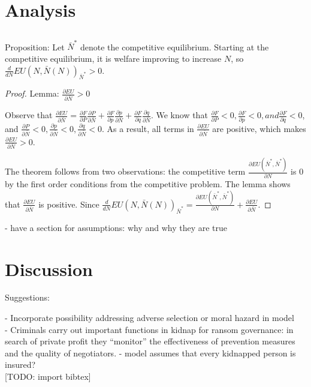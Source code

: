 \documentclass[12pt]{article}
\begin{document}
\section{Analysis}  

\subsection{}

Proposition: Let $\bar{N}^*$ denote the competitive equilibrium. Starting at the competitive equilibrium, it is welfare improving to increase $N$, so $\frac{d}{dN}EU(N,\bar{N}(N))_{\bar{N}^*} > 0$.

\begin{proof}

Lemma: $\frac{\partial EU}{\partial \bar{N}} > 0$

Observe that $\frac{\partial EU}{\partial \bar{N}} = \frac{\partial F}{\partial P} \frac{\partial P}{\partial \bar{N}} + \frac{\partial F}{\partial p} \frac{\partial p}{\partial \bar{N}} + \frac{\partial F}{\partial q} \frac{\partial q}{\partial \bar{N}}$. We know that $\frac{\partial F}{\partial P} < 0, \frac{\partial F}{\partial p} < 0, and \frac{\partial F}{\partial q} < 0$, and $\frac{\partial P}{\partial \bar{N}} <0, \frac{\partial p}{\partial \bar{N}} < 0, \frac{\partial q}{\partial \bar{N}} < 0$. As a result, all terms in  $\frac{\partial EU}{\partial \bar{N}}$ are positive, which makes $\frac{\partial EU}{\partial \bar{N}} > 0$.

The theorem follows from two observations: the competitive term $\frac{\partial EU(\bar{N}^*, \bar{N}^*)}{\partial N}$ is 0 by the first order conditions from the competitive problem. The lemma shows that $\frac{\partial EU}{\partial \bar{N}}$ is positive. Since $\frac{d}{dN}EU(N,\bar{N}(N))_{\bar{N}^*} = \frac{\partial EU(\bar{N}^*, \bar{N}^*)}{\partial N} + \frac{\partial EU}{\partial \bar{N}}$.
\end{proof}


- have a section for assumptions: why and why they are true

\section{Discussion}

Suggestions:

- Incorporate possibility addressing adverse selection or moral hazard in model \\
- Criminals carry out important functions in kidnap for ransom governance: in search of private profit they “monitor” the effectiveness of prevention measures and the quality of negotiators.
- model assumes that every kidnapped person is insured?
\\

[TODO: import bibtex]
\end{document}
